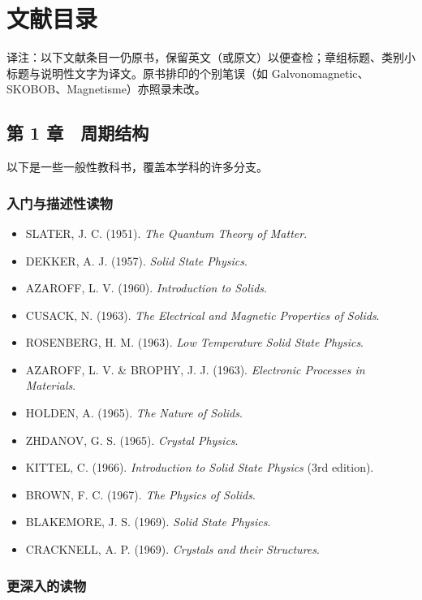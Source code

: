
\chapter*{文献目录}

{\small 译注：以下文献条目一仍原书，保留英文（或原文）以便查检；章组标题、类别小标题与说明性文字为译文。原书排印的个别笔误（如 Galvonomagnetic、SKOBOB、Magnetisme）亦照录未改。}

\section*{第 1 章　周期结构}

以下是一些一般性教科书，覆盖本学科的许多分支。

\subsection*{入门与描述性读物}

\begin{itemize}[leftmargin=2em, itemsep=0.2em]
\item SLATER, J. C. (1951). \emph{The Quantum Theory of Matter}.
\item DEKKER, A. J. (1957). \emph{Solid State Physics}.
\item AZAROFF, L. V. (1960). \emph{Introduction to Solids}.
\item CUSACK, N. (1963). \emph{The Electrical and Magnetic Properties of Solids}.
\item ROSENBERG, H. M. (1963). \emph{Low Temperature Solid State Physics}.
\item AZAROFF, L. V. \& BROPHY, J. J. (1963). \emph{Electronic Processes in Materials}.
\item HOLDEN, A. (1965). \emph{The Nature of Solids}.
\item ZHDANOV, G. S. (1965). \emph{Crystal Physics}.
\item KITTEL, C. (1966). \emph{Introduction to Solid State Physics} (3rd edition).
\item BROWN, F. C. (1967). \emph{The Physics of Solids}.
\item BLAKEMORE, J. S. (1969). \emph{Solid State Physics}.
\item CRACKNELL, A. P. (1969). \emph{Crystals and their Structures}.
\end{itemize}

\subsection*{更深入的读物}

